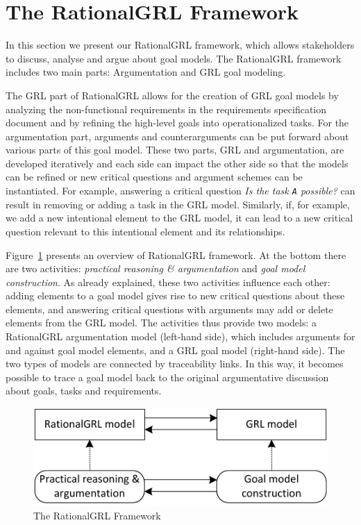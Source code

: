 \section{The RationalGRL Framework}
\label{sect:overview}

In this section we present our RationalGRL framework, which allows stakeholders to discuss, analyse and argue about goal models. The RationalGRL framework includes two main parts: Argumentation and GRL goal modeling. 

The GRL part of RationalGRL allows for the creation of GRL goal models by analyzing the non-functional requirements in the requirements specification document and by refining the high-level goals into operationalized tasks. For the argumentation part, arguments and counterarguments can be put forward about various parts of this goal model.
These two parts, GRL and argumentation, are developed iteratively and each side can impact the other side so that the models can be refined or new critical questions and argument schemes can be instantiated. For example, answering a critical question \emph{Is the task \texttt{A} possible?} can result in removing or adding a task in the GRL model. Similarly,  if, for example, we add a new intentional element to the GRL model, it can lead to a new critical question relevant to this intentional element and its relationships.  

Figure~\ref{fig:rationalgrl-framework} presents an overview of RationalGRL framework. At the bottom there are two activities: \emph{practical reasoning \& argumentation} and \emph{goal model construction}. As already explained, these two activities influence each other: adding elements to a goal model gives rise to new critical questions about these elements, and answering critical questions with arguments may add or delete elements from the GRL model. The activities thus provide two models: a RationalGRL argumentation model (left-hand side), which includes arguments for and against goal model elements, and a GRL goal model (right-hand side). The two types of models are connected by traceability links. In this way, it becomes possible to trace a goal model back to the original argumentative discussion about goals, tasks and requirements.

\begin{figure}[ht]
\centering
\includegraphics[scale=0.4]{img/framework}
\caption{The RationalGRL Framework}
\label{fig:rationalgrl-framework}
\end{figure}

